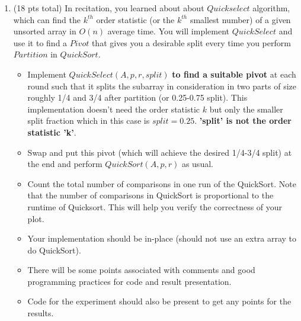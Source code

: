 \documentclass[12pt]{article}
\theoremstyle{remark}
\begin{document}
\begin{enumerate}



\item (18 pts total) In recitation, you learned about about $Quickselect$ algorithm, which can find the $k^{th}$ order statistic (or the $k^{th}$ smallest number) of a given unsorted array in $O(n)$ average time. You will implement $QuickSelect$ and use it to find a $Pivot$ that gives you a desirable split every time you perform $Partition$ in $QuickSort$.

\begin{itemize}
\item Implement $QuickSelect(A, p, r, split)$ \textbf{to find a suitable pivot} at each round such that it splits the subarray in consideration in two parts of size roughly 1/4 and 3/4 after partition (or 0.25-0.75 split). This implementation doesn't need the order statistic $k$ but only the smaller split fraction which in this case is $split = 0.25$. \textbf{'split' is not the order statistic 'k'}.
\item Swap and put this pivot (which will achieve the desired 1/4-3/4 split) at the end and perform $QuickSort(A, p, r)$ as usual. 
\item Count the total number of comparisons in one run of the QuickSort. Note that the number of comparisons in QuickSort is proportional to the runtime of Quicksort. This will help you verify the correctness of your plot.
\item Your implementation should be in-place (should not use an extra array to do QuickSort).
\item There will be some points associated with comments and good programming practices for code and result presentation.
\item Code for the experiment should also be present to get any points for the results.
\end{itemize}


\end{enumerate}
\end{document}
